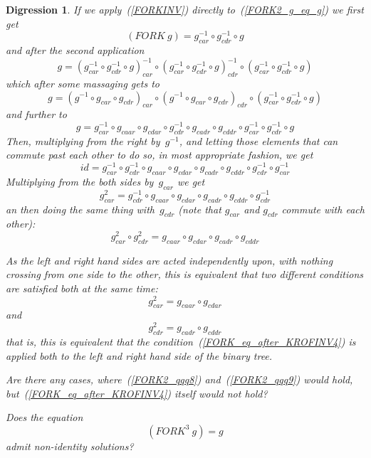 \documentclass[11pt]{article} %
\newtheorem{digression}{Digression}
\newcommand{\eqn}[1]{(\ref{#1})}
\newcommand{\eeq}{\end{equation}}
\newcommand{\beql}[1]{\begin{equation}\label{#1}}
\newcommand{\funapply}{\ensuremath{\circ}}
\begin{document}
\begin{digression}
If we apply~\eqn{FORKINV} directly to~\eqn{FORK2_g_eq_g}
we first get
\beql{FORK2_qqq1}
(FORK~g) = g^{-1}_{car} \funapply g^{-1}_{cdr} \funapply g
\eeq
and after the second application
\beql{FORK2_qqq2}
g = (g^{-1}_{car} \funapply g^{-1}_{cdr} \funapply g)^{-1}_{car} \funapply  (g^{-1}_{car} \funapply g^{-1}_{cdr} \funapply g)^{-1}_{cdr} \funapply (g^{-1}_{car} \funapply g^{-1}_{cdr} \funapply g)
\eeq
which after some massaging gets to
\beql{FORK2_qqq3}
g = (g^{-1} \funapply g_{car} \funapply g_{cdr})_{car} \funapply (g^{-1} \funapply g_{car} \funapply g_{cdr})_{cdr} \funapply (g^{-1}_{car} \funapply g^{-1}_{cdr} \funapply g)
\eeq
and further to
\beql{FORK2_qqq4}
g = g^{-1}_{car} \funapply g_{caar} \funapply g_{cdar} \funapply g^{-1}_{cdr} \funapply g_{cadr} \funapply g_{cddr} \funapply g^{-1}_{car} \funapply g^{-1}_{cdr} \funapply g
\eeq
Then, multiplying from the right by~$g^{-1}$, and letting those elements
that can commute past each other to do so, in most appropriate fashion,
we get
\beql{FORK2_qqq5}
id = g^{-1}_{car} \funapply g^{-1}_{cdr} \funapply g_{caar} \funapply g_{cdar} \funapply g_{cadr} \funapply g_{cddr} \funapply g^{-1}_{cdr} \funapply g^{-1}_{car}
\eeq
Multiplying from the both sides by~$g_{car}$ we get
\beql{FORK2_qqq6}
g^2_{car} = g^{-1}_{cdr} \funapply g_{caar} \funapply g_{cdar} \funapply g_{cadr} \funapply g_{cddr} \funapply g^{-1}_{cdr}
\eeq
an then doing the same thing with~$g_{cdr}$ (note that $g_{car}$ and $g_{cdr}$ commute with each other):
\beql{FORK2_qqq7}
g^2_{car} \funapply g^2_{cdr} = g_{caar} \funapply g_{cdar} \funapply g_{cadr} \funapply g_{cddr}
\eeq

As the left and right hand sides are acted independently upon, with nothing
crossing from one side to the other, this is
equivalent that two different conditions are satisfied both at
the same time:
\beql{FORK2_qqq8}
g^2_{car}  = g_{caar} \funapply g_{cdar}
\eeq
and
\beql{FORK2_qqq9}
g^2_{cdr} = g_{cadr} \funapply g_{cddr}
\eeq
that is, this is equivalent that the condition~\eqn{FORK_eq_after_KROFINV4}
is applied both to the left and right hand side of the binary tree.

Are there any cases, where~\eqn{FORK2_qqq8} and~\eqn{FORK2_qqq9}
would hold, but~\eqn{FORK_eq_after_KROFINV4} itself would not hold?



Does the equation 
\beql{FORK3_g_eq_g}
(FORK^{3}~g) = g
\eeq
admit non-identity solutions?

\end{digression}
\end{document}
